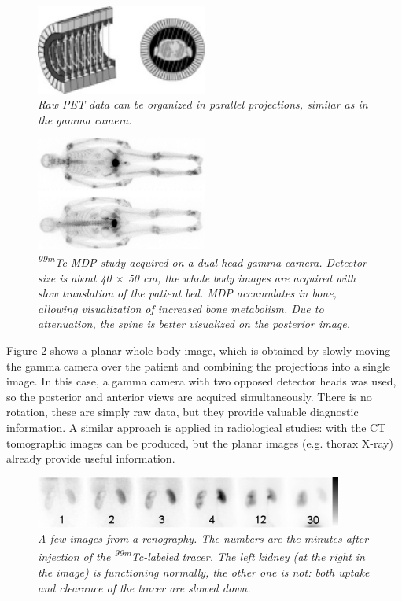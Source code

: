 \documentclass[11pt,oneside]{article}
\begin{document}
\begin{figure}[tb]
\centering
\includegraphics[width=0.5\textwidth]{figs/fig_pet_parallel.pdf}
\caption{\label{fig:pet_parallel} \emph{Raw PET data can be organized in
parallel projections, similar as in the gamma camera.}}
\end{figure}

\begin{figure}[tb]
\centering
\includegraphics[width=0.5\textwidth]{figs/fig_jnwb.pdf}
\caption{\label{fig:planarwb} \emph{\textsuperscript{99m}Tc-MDP study acquired on a dual
head gamma camera. Detector size is about 40 $\times$ 50 cm, the whole body
images are acquired with slow translation of the patient bed. MDP accumulates
in bone, allowing visualization of increased bone metabolism. Due to
attenuation, the spine is better visualized on the posterior image.}}
\end{figure}

Figure \ref{fig:planarwb} shows a planar whole body image, which is obtained
by slowly moving the gamma camera over the patient and combining the
projections into a single image. In this case, a gamma camera with two opposed
detector heads was used, so the posterior and anterior views are acquired
simultaneously. There is no rotation, these are simply raw data, but they
provide valuable diagnostic information. A similar approach is applied in
radiological studies: with the CT tomographic images can be produced, but the
planar images (e.g. thorax X-ray) already provide useful information. 

\begin{figure}[tb]
\centering
\includegraphics[width=0.9\textwidth]{figs/fig_renaldynimg.pdf}
\caption{\label{fig:renaldyn} \emph{A few images from a
    renography. The numbers are the minutes after injection of the
    \textsuperscript{99m}Tc-labeled tracer. The left kidney (at the right in the
    image) is functioning normally, the other one is not: both uptake
    and clearance of the tracer are slowed down.}}
\end{figure}
\end{document}
